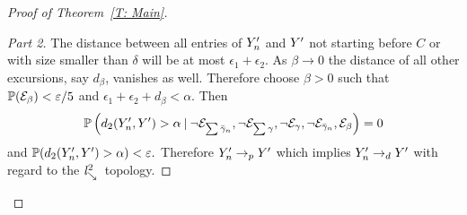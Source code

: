 \begin{proof}[Proof of Theorem~\ref{T: Main}]
\begin{proof}[Part 2]
	The distance between all entries of $Y'_n$ and $Y'$ not starting before $C$ or with size smaller than $\delta$ 
	will be at most $\epsilon_1 + \epsilon_2$.
	As $\beta \rightarrow 0$ the distance of all other excursions, say $d_{\beta}$, vanishes as well.
	Therefore choose $\beta > 0$ such that $\mathbb{P}(\mathcal{E}_{\beta}) < \varepsilon / 5$ and $\epsilon_1 + \epsilon_2 + d_{\beta} < \alpha$.
	Then
	\begin{equation*}
	\mathbb{P}\left( d_{2}(Y'_n, Y') > \alpha \: | \: 
	\neg\mathcal{E}_{\sum\bar{\gamma}_n}, \neg\mathcal{E}_{\sum\gamma}, \neg\mathcal{E}_{\gamma}, \neg\mathcal{E}_{\bar{\gamma}_n}, \mathcal{E}_{\beta}\right) = 0
	\end{equation*}
	and 
	\begin{math}
	\mathbb{P}( d_{2}(Y'_n, Y') > \alpha) < \varepsilon.
	\end{math}
	Therefore $Y'_n \rightarrow_p Y'$ which implies $Y'_n \rightarrow_d Y'$ with regard to the $\mathit{l}^2_{\searrow}$~topology.
	\end{proof}

	\phantom\qedhere
\end{proof}


